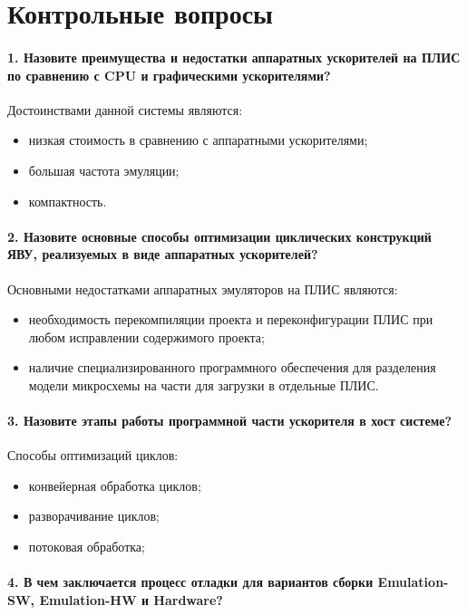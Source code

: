 \chapter*{Контрольные вопросы}

\subsubsection{\textbf{1. Назовите преимущества и недостатки аппаратных ускорителей на ПЛИС по сравнению с CPU и графическими ускорителями?}}

Достоинствами данной системы являются:
\begin{itemize}
	\item низкая стоимость в сравнению с аппаратными ускорителями;
	\item большая частота эмуляции;
	\item компактность.
\end{itemize}

\subsubsection{\textbf{2. Назовите основные способы оптимизации циклических конструкций ЯВУ, реализуемых в виде аппаратных ускорителей?}}
Основными недостатками аппаратных эмуляторов на ПЛИС являются: 
\begin{itemize}
	\item необходимость перекомпиляции проекта и переконфигурации ПЛИС при любом исправлении содержимого проекта;
	\item наличие специализированного программного обеспечения для разделения модели микросхемы на части для загрузки в отдельные ПЛИС.
\end{itemize}



\subsubsection{\textbf{3. Назовите этапы работы программной части ускорителя в хост системе?}}
Способы оптимизаций циклов:
\begin{itemize}
	\item конвейерная обработка циклов;
	\item разворачивание циклов;
	\item потоковая обработка;
\end{itemize}


\subsubsection{\textbf{4. В чем заключается процесс отладки для вариантов сборки Emulation-SW, Emulation-HW и Hardware?}}

